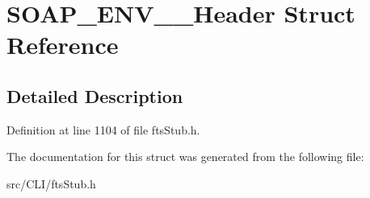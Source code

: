 \section{SOAP\_\-ENV\_\-\_\-Header Struct Reference}
\label{structSOAP__ENV____Header}


\subsection{Detailed Description}


Definition at line 1104 of file ftsStub.h.



The documentation for this struct was generated from the following file:\begin{DoxyCompactItemize}
\item 
src/CLI/ftsStub.h\end{DoxyCompactItemize}
